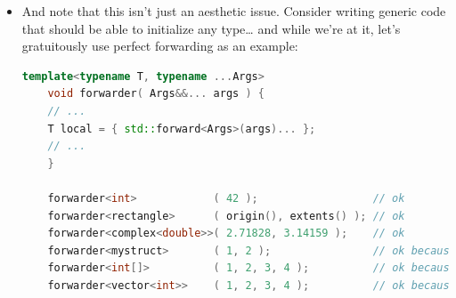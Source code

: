 \documentclass[a4paper,12pt,twoside]{book}
\newcommand{\Hilight}[1]{\makebox[0pt][l]{\color{yellow}\rule[-3pt]{#1em}{11pt}}}
\begin{document}
\begin{itemize}
	
	\begin{lstlisting}[frame=single, language=c++,mathescape=true]
	int a{0};
	string s{"hello"};
	string s2{s}; //copy construction
	vector<string> v{"foo", "bar"}; 
	// Basically the same, ignoring some small technicalities.
	vector<string> v = {"foo", "bar"};
	// Vector takes a braced-init-list of elements.
	// Usable with 'new' expressions.
	auto p = new vector<string>{"foo", "bar"};
	
	// A map can take a list of pairs. Nested braced-init-lists work.
	map<int, string> m{{1, "one"}, {2, "2"}};
	
	double *pd= new double [3] {0.5, 1.2, 12.99}; 
	$\Hilight{22}$//before { no =,  or compile error
	
	
	// C++98 
	rectangle       w( origin(), extents() );       // oops, vexing parse 
	complex<double> c( 2.71828, 3.14159 ); 
	mystruct        m = { 1, 2 };
	int             a[] = { 1, 2, 3, 4 };
	vector<int>     v;                              // urk, need more code
	for( int i = 1; i <= 4; ++i ) v.push_back(i);   //   to initialize this
	
	// C++11 (note: "=" is mostly optional)
	rectangle       w   = { origin(), extents() }; 
	complex<double> c   = { 2.71828, 3.14159 }; 
	mystruct        m   = { 1, 2 }; 
	int             a[] = { 1, 2, 3, 4 };
	vector<int>     v   = { 1, 2, 3, 4 };
	
	\end{lstlisting}
	
	\item And note that this isn’t just an aesthetic issue. Consider writing generic code that should be able to initialize any type… and while we’re at it, let’s gratuitously use perfect forwarding as an example:
	
	\begin{lstlisting}[frame=single, language=c++,mathescape=true]
	template<typename T, typename ...Args>
	void forwarder( Args&&... args ) {
	// ...
	T local = { std::forward<Args>(args)... };
	// ...
	}
	
	forwarder<int>            ( 42 );                  // ok
	forwarder<rectangle>      ( origin(), extents() ); // ok
	forwarder<complex<double>>( 2.71828, 3.14159 );    // ok
	forwarder<mystruct>       ( 1, 2 );                // ok because of {}
	forwarder<int[]>          ( 1, 2, 3, 4 );          // ok because of {}
	forwarder<vector<int>>    ( 1, 2, 3, 4 );          // ok because of {}
	\end{lstlisting}
	

\end{itemize}
\end{document}
